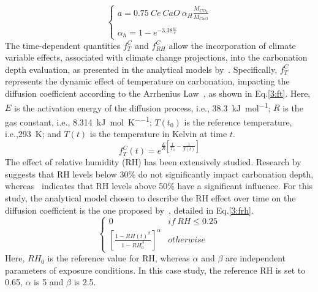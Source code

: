 \begin{equation}
    \left\{
    \begin{array}{ll}
    a = 0.75 \ Ce \ CaO \ \alpha_H \frac{M_{CO_2}}{M_{CaO}} \\
      \\
      \alpha_h = 1 - e^{-3.38 \frac{w}{c}}
    \end{array}
    \right.
    \label{eq_a}
\end{equation}
The time-dependent quantities $f_T^C$ and $f_{RH}^C$ allow the incorporation of climate variable effects, associated with climate change projections, into the carbonation depth evaluation, as presented in the analytical models by~\textcite{Carbonation_BASTIDASARTEAGA}. 
Specifically, $f_T^C$ represents the dynamic effect of temperature on carbonation, impacting the diffusion coefficient according to the Arrhenius Law~\cite{Carbonation_YOON}, as shown in Eq.\ref{3:ft}. Here, $E$ is the activation energy of the diffusion process, i.e.,
\SI{38.3}{\kilo\joule\per\mole}; $R$ is the gas constant, i.e., \SI{8.314}{\kilo\joule\per\mole\per\kelvin}; $T(t_0)$ is the reference temperature, i.e.,\SI{293}{\kelvin}; and $T(t)$ is the temperature in Kelvin at time $t$.
\begin{equation}
    \label{3:ft}
        f_T^C (t) = e^{\frac{E}{R} \left[ \frac{1}{T_0} - \frac{1}{T(t)} \right]}
\end{equation}
The effect of relative humidity (RH) has been extensively studied. Research by~\textcite{f_rh_Al-Khaiat} suggests that RH levels below 30\% do not significantly impact carbonation depth, whereas~\textcite{f_rh_BARY} indicates that RH levels above 50\% have a significant influence. For this study, the analytical model chosen to describe the RH effect over time on the diffusion coefficient is the one proposed by~\textcite{Carbonation_BASTIDASARTEAGA}, detailed in Eq.\ref{3:frh}.
\begin{equation}
    \left\{
    \begin{array}{ll}
    0 & if \ RH \leq 0.25\\
    \left[\frac{1-RH(t)^\beta}{1-RH_0^\beta} \right]^\alpha & otherwise
    \end{array}
    \right.
    \label{3:frh}
\end{equation}
Here, $RH_0$ is the reference value for RH, whereas $\alpha$ and $\beta$ are independent parameters of exposure conditions. In this case study, the reference RH is set to 0.65, $\alpha$ is 5 and $\beta$ is 2.5.

